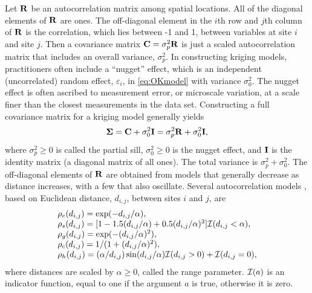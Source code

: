 \documentclass[11pt, titlepage]{article}\usepackage[]{graphicx}\usepackage[]{color}
\begin{document}
\begin{spacing}{1.9}
\begin{flushleft}
Let $\mathbf{R}$ be an autocorrelation matrix among spatial locations.  All of the diagonal elements of $\mathbf{R}$ are ones. The off-diagonal element in the $i$th row and $j$th column of $\mathbf{R}$ is the correlation, which lies between -1 and 1, between variables at site $i$ and site $j$.  Then a covariance matrix $\mathbf{C} = \sigma^2_p\mathbf{R}$ is just a scaled autocorrelation matrix that includes an overall variance, $\sigma^2_p$.  In constructing kriging models, practitioners often include a ``nugget'' effect, which is an independent (uncorrelated) random effect, $\varepsilon_i$, in \ref{eq:OKmodel} with variance $\sigma_0^2$.  The nugget effect is often ascribed to measurement error, or microscale variation, at a scale finer than the closest measurements in the data set.  Constructing a full covariance matrix for a kriging model generally yields
\begin{equation} \label{eq:bSigma}
	\mbox{\boldmath $\Sigma$} = \mathbf{C} + \sigma^2_0\mathbf{I} = \sigma^2_p\mathbf{R} + \sigma^2_0\mathbf{I},
\end{equation}
where $\sigma^2_p \ge 0$ is called the partial sill, $\sigma^2_0 \ge 0$ is the nugget effect, and $\mathbf{I}$ is the identity matrix (a diagonal matrix of all ones). The total variance is $\sigma^2_p + \sigma^2_0$.  The off-diagonal elements of $\mathbf{R}$ are obtained from models that generally decrease as distance increases, with a few that also oscillate. Several autocorrelation models \citep[][p. 80--93]{Chil:Delf:geos:1999}, based on Euclidean distance, $d_{i,j}$, between sites $i$ and $j$, are
\begin{equation} \label{eq:autocorrModels}
	\begin{array}{l}
  \rho_{e}(d_{i,j}) = \exp(-d_{i,j}/\alpha), \\
  \rho_{s}(d_{i,j}) = [1 - 1.5(d_{i,j}/\alpha) + 0.5(d_{i,j}/\alpha)^3] \mathcal{I}(d_{i,j} < \alpha), \\
  \rho_{g}(d_{i,j}) = \exp(-(d_{i,j}/\alpha)^2), \\
	\rho_{c}(d_{i,j}) = 1/(1+(d_{i,j}/\alpha)^2), \\
	\rho_{h}(d_{i,j}) = (\alpha/d_{i,j})\sin(d_{i,j}/\alpha)\mathcal{I}(d_{i,j} > 0) + \mathcal{I}(d_{i,j} = 0),
	\end{array}
\end{equation}
where distances are scaled by $\alpha \ge 0$, called the range parameter. $\mathcal{I}(a)$ is an indicator function, equal to one if the argument $a$ is true, otherwise it is zero.


\end{flushleft}
\end{spacing}
\end{document}
